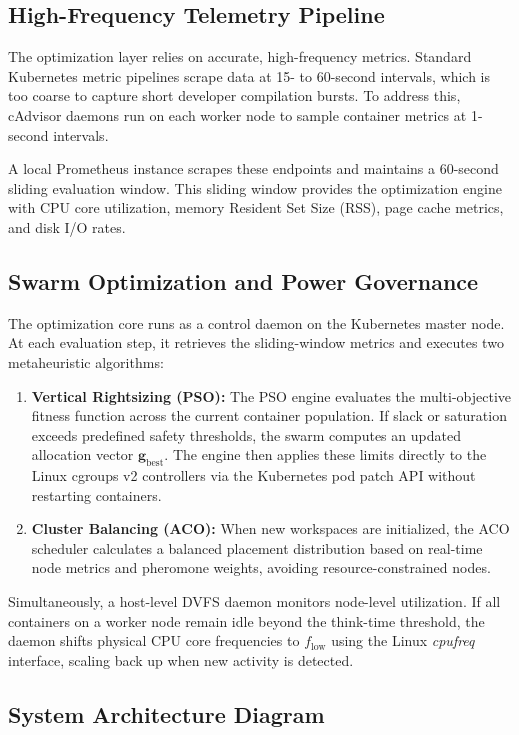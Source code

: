 \documentclass[12pt,a4paper]{report}
\begin{document}
	\subsection{High-Frequency Telemetry Pipeline}
	The optimization layer relies on accurate, high-frequency metrics. Standard Kubernetes metric pipelines scrape data at 15- to 60-second intervals, which is too coarse to capture short developer compilation bursts. To address this, cAdvisor daemons run on each worker node to sample container metrics at 1-second intervals.
	
	A local Prometheus instance scrapes these endpoints and maintains a 60-second sliding evaluation window. This sliding window provides the optimization engine with CPU core utilization, memory Resident Set Size (RSS), page cache metrics, and disk I/O rates.
	
	\subsection{Swarm Optimization and Power Governance}
	The optimization core runs as a control daemon on the Kubernetes master node. At each evaluation step, it retrieves the sliding-window metrics and executes two metaheuristic algorithms:
	\begin{enumerate}
		\item \textbf{Vertical Rightsizing (PSO):} The PSO engine evaluates the multi-objective fitness function across the current container population. If slack or saturation exceeds predefined safety thresholds, the swarm computes an updated allocation vector $\mathbf{g}_{\text{best}}$. The engine then applies these limits directly to the Linux cgroups v2 controllers via the Kubernetes pod patch API without restarting containers.
		\item \textbf{Cluster Balancing (ACO):} When new workspaces are initialized, the ACO scheduler calculates a balanced placement distribution based on real-time node metrics and pheromone weights, avoiding resource-constrained nodes.
	\end{enumerate}
	
	Simultaneously, a host-level DVFS daemon monitors node-level utilization. If all containers on a worker node remain idle beyond the think-time threshold, the daemon shifts physical CPU core frequencies to $f_{\text{low}}$ using the Linux \textit{cpufreq} interface, scaling back up when new activity is detected.
	
	\clearpage
	\subsection{System Architecture Diagram}
	
\end{document}
